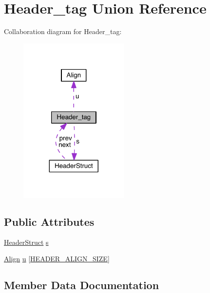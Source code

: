 \hypertarget{union_header__tag}{}\section{Header\+\_\+tag Union Reference}
\label{union_header__tag}


Collaboration diagram for Header\+\_\+tag\+:\nopagebreak
\begin{figure}[H]
\begin{center}
\leavevmode
\includegraphics[width=155pt]{union_header__tag__coll__graph}
\end{center}
\end{figure}
\subsection*{Public Attributes}
\begin{DoxyCompactItemize}
\item 
\hyperlink{struct_header_struct}{Header\+Struct} \hyperlink{union_header__tag_a9431ea46df35bb4feca322cb96246bab}{s}
\item 
\hyperlink{union_align}{Align} \hyperlink{union_header__tag_a5fbc38dfa9adcb54937811882ea1e8b3}{u} \mbox{[}\hyperlink{memory_8c_ad1b52843007ad984fe47a9e236305e74}{H\+E\+A\+D\+E\+R\+\_\+\+A\+L\+I\+G\+N\+\_\+\+S\+I\+Z\+E}\mbox{]}
\end{DoxyCompactItemize}


\subsection{Member Data Documentation}
\hypertarget{union_header__tag_a9431ea46df35bb4feca322cb96246bab}{}
